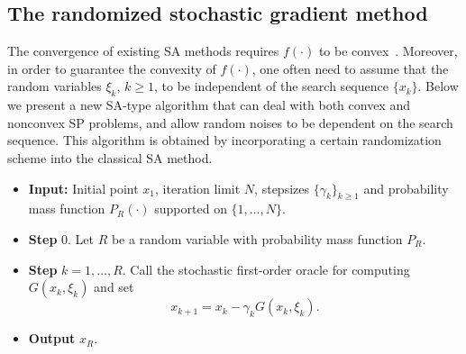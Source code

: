 \documentclass[final]{siamltex}
\newcommand{\beq}{\begin{equation}}
\newcommand{\eeq}{\end{equation}}
\newcommand{\beqa}{\begin{eqnarray}}
\newcommand{\eeqa}{\end{eqnarray}}
\def\eqnok#1{(\ref{#1})}
\def\vgap{\vspace*{.1in}}
\newcommand{\bbe}{\mathbb{E}}
\newcommand{\bbr}{\mathbb{R}}
\def\SFO{{\cal SFO}}
\def\cE{{\bbr^n}}
\begin{document}
\subsection{The randomized stochastic gradient method} \label{sec_RSG}




\vgap

The convergence of existing SA methods requires
$f(\cdot)$ to be convex~\cite{NJLS09-1,lns11,Lan10-3,GhaLan12-2a,GhaLan10-1b}.
Moreover, in order to guarantee the convexity of $f(\cdot)$,
one often need to assume that the random variables $\xi_k$, $k\ge 1$,
to be independent of the search sequence $\{x_k\}$. Below we present a new SA-type algorithm that
can deal with both convex and nonconvex SP problems, and allow random noises
to be dependent on the search sequence. This algorithm is obtained by
incorporating a certain randomization scheme into the classical SA method.

\vgap

\begin{itemize}
\item [] {\bf Input:} Initial point $x_1$,
iteration limit $N$, stepsizes $\{\gamma_k\}_{k \ge 1}$
and probability mass function $P_{R}(\cdot)$ supported on $\{1, \ldots, N\}$.
\item[] {\bf Step} $0$. Let $R$ be a random variable with probability mass function $P_{R}$.
\item [] {\bf Step} $k = 1, \ldots, R$.
Call the stochastic first-order oracle for computing $G(x_k, \xi_k)$ and
set
\beq \label{update_SA}
x_{k+1} = x_k - \gamma_k G(x_k, \xi_k).
\eeq
\item[]  {\bf Output} $x_R$.
\end{itemize}
\end{document}
